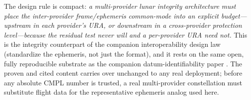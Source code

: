 The design rule is compact: \emph{a multi-provider lunar integrity architecture must
place the inter-provider frame/ephemeris common-mode into an explicit budget---upstream
in each provider's URA, or downstream in a cross-provider protection level---because the
residual test never will and a per-provider URA need not.} This is the integrity
counterpart of the companion interoperability design law \citep{baweja2026interop}
(standardize the ephemeris, not just the format), and it rests on the same open,
fully reproducible substrate as the companion datum-identifiability paper
\citep{baweja2026datum}. The proven and cited content carries over unchanged to any real
deployment; before any absolute CMPL number is trusted, a real multi-provider
constellation must substitute flight data for the representative ephemeris analog used
here.
